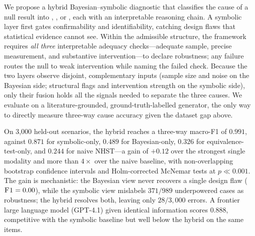 We propose a hybrid Bayesian--symbolic diagnostic that
classifies the cause of a null result into \GR, \WI, or \DF, each with an
interpretable reasoning chain. A symbolic layer first gates confirmability and
identifiability, catching design flaws that statistical evidence cannot see.
Within the admissible structure, the framework requires \emph{all three}
interpretable adequacy checks---adequate sample, precise measurement, and
substantive intervention---to declare robustness; any failure routes the null to
weak intervention while naming the failed check. Because the two layers observe
disjoint, complementary inputs (sample size and noise on the Bayesian side;
structural flags and intervention strength on the symbolic side), only their
fusion holds all the signals needed to separate the three causes. We evaluate on
a literature-grounded, ground-truth-labelled generator, the only way to directly
measure three-way cause accuracy given the dataset gap above.

 On 3{,}000 held-out scenarios, the hybrid reaches a
three-way macro-F1 of $0.991$, against $0.871$ for symbolic-only, $0.489$ for
Bayesian-only, $0.326$ for equivalence-test-only, and $0.244$ for naive NHST---a
gain of $+0.12$ over the strongest single modality and more than $4\times$ over
the naive baseline, with non-overlapping bootstrap confidence intervals and
Holm-corrected McNemar tests at $p \ll 0.001$. The gain is mechanistic: the
Bayesian view never recovers a single design flaw ($\textsc{F1}=0.00$), while the
symbolic view mislabels $371/989$ underpowered cases as robustness; the hybrid
resolves both, leaving only $28/3{,}000$ errors. A frontier large language model
(GPT-4.1) given identical information scores $0.888$, competitive with the
symbolic baseline but well below the hybrid on the same items.

